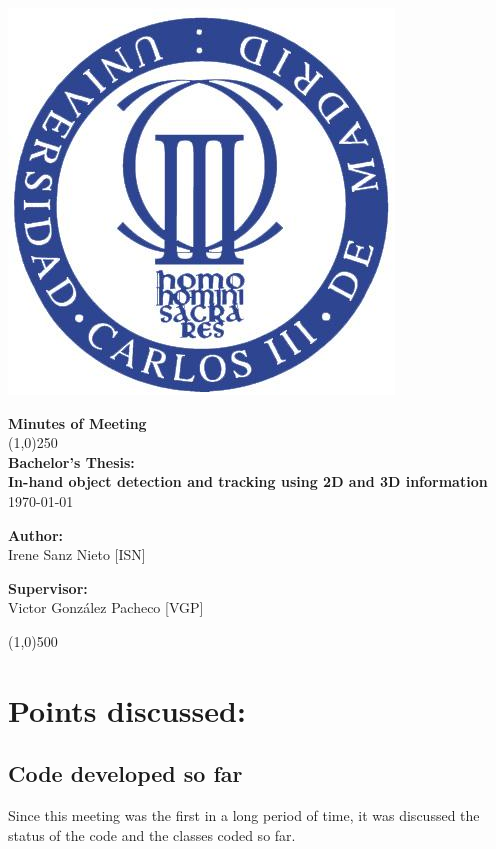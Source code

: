 \documentclass{article}
\newenvironment{myindentpar}[1]%
 {\begin{list}{}%
         {\setlength{\leftmargin}{#1}}%
         \item[]%
 }
 {\end{list}}
\begin{document}
\includegraphics[width=0.1\linewidth]{../template/uc3m.jpg}

\vspace{-1cm}
\begin{minipage}[b]{1\linewidth}
	\begin{center}
	{\Huge \bfseries{Minutes of Meeting}}\\
	\line(1,0){250}\\[0.5cm]
	{\LARGE \textbf{Bachelor's Thesis:\\[0.5cm] In-hand object detection and tracking using 2D and 3D information}}\\[0.5cm]
	{\large \today}
	\end{center}
\end {minipage}



\begin{minipage}{0.55\textwidth}
\begin{flushleft} \large
\textbf{{Author:}\\}
Irene Sanz Nieto [ISN]\\
\end{flushleft}
\end{minipage}
\begin{minipage}{0.4\textwidth}
\begin{flushright} \large
\textbf{Supervisor: }\\
Victor González Pacheco [VGP]
\end{flushright}\end{minipage}

\begin{center}
\line(1,0){500}
\end{center}

\renewcommand{\thesubsection}
{\hspace*{1cm} \arabic{section}.\arabic{subsection}}



\section{\LARGE Points discussed: }

  \subsection{Code developed so far}
		\begin{myindentpar}{1cm} 
    Since this meeting was the first in a long period of time, it was discussed the status of the code and the classes coded so far. 
    
		\end{myindentpar}
\end{document}

